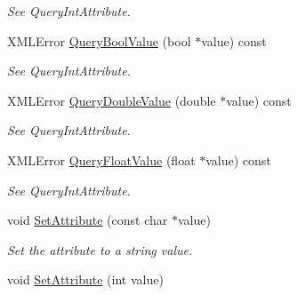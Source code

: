\begin{DoxyCompactItemize}
\begin{DoxyCompactList}\small\item\em See Query\+Int\+Attribute. \end{DoxyCompactList}\item 
\mbox{\label{classtinyxml2_1_1XMLAttribute_a5f32e038954256f61c21ff20fd13a09c}} 
X\+M\+L\+Error \hyperlink{classtinyxml2_1_1XMLAttribute_a5f32e038954256f61c21ff20fd13a09c}{Query\+Bool\+Value} (bool $\ast$value) const
\begin{DoxyCompactList}\small\item\em See Query\+Int\+Attribute. \end{DoxyCompactList}\item 
\mbox{\label{classtinyxml2_1_1XMLAttribute_a2aa6e55e8ea03af0609cf6690bff79b9}} 
X\+M\+L\+Error \hyperlink{classtinyxml2_1_1XMLAttribute_a2aa6e55e8ea03af0609cf6690bff79b9}{Query\+Double\+Value} (double $\ast$value) const
\begin{DoxyCompactList}\small\item\em See Query\+Int\+Attribute. \end{DoxyCompactList}\item 
\mbox{\label{classtinyxml2_1_1XMLAttribute_a049dea6449a6259b6cfed44a9427b607}} 
X\+M\+L\+Error \hyperlink{classtinyxml2_1_1XMLAttribute_a049dea6449a6259b6cfed44a9427b607}{Query\+Float\+Value} (float $\ast$value) const
\begin{DoxyCompactList}\small\item\em See Query\+Int\+Attribute. \end{DoxyCompactList}\item 
\mbox{\label{classtinyxml2_1_1XMLAttribute_a406d2c4a13c7af99a65edb59dd9f7581}} 
void \hyperlink{classtinyxml2_1_1XMLAttribute_a406d2c4a13c7af99a65edb59dd9f7581}{Set\+Attribute} (const char $\ast$value)
\begin{DoxyCompactList}\small\item\em Set the attribute to a string value. \end{DoxyCompactList}\item 
\mbox{\label{classtinyxml2_1_1XMLAttribute_ad86d7d7058d76761c3a80662566a57e5}} 
void \hyperlink{classtinyxml2_1_1XMLAttribute_ad86d7d7058d76761c3a80662566a57e5}{Set\+Attribute} (int value)

\end{DoxyCompactItemize}
